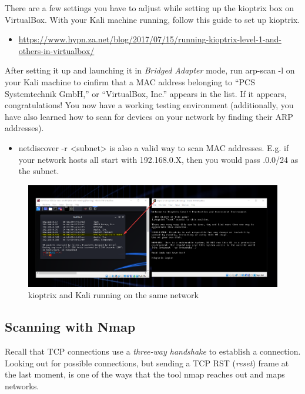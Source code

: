\documentclass[a4paper,11pt]{article}
\renewcommand{\tt}[2][tt]{\textcolor{#1}{\ttfamily #2}}%
\begin{document}
There are a few settings you have to adjust while setting up the kioptrix box on VirtualBox. With your Kali machine running, follow this guide to set up kioptrix.
\begin{itemize}
    \item \url{https://www.hypn.za.net/blog/2017/07/15/running-kioptrix-level-1-and-others-in-virtualbox/}
\end{itemize}
After setting it up and launching it in \textit{Bridged Adapter} mode, run \tt{arp-scan -l} on your Kali machine to cinfirm that a MAC address belonging to ``PCS Systemtechnik GmbH,'' or ``VirtualBox, Inc.'' appears in the list. If it appears, congratulations! You now have a working testing environment (additionally, you have also learned how to scan for devices on your network by finding their ARP addresses).
\begin{itemize}
    \item \tt{netdiscover -r <subnet>} is also a valid way to scan MAC addresses. E.g. if your network hosts all start with 192.168.0.X, then you would pass \tt{192.168.0.0/24} as the \tt{subnet}.
\end{itemize}

\begin{figure}[h]
    \centering
    \includegraphics[width=1\textwidth]{images/kioptrix1.png}
    \caption{\small{kioptrix and Kali running on the same network}}
    \label{fig:kioptrix1}
\end{figure}

\subsection{Scanning with Nmap}

Recall that TCP connections use a \textit{three-way handshake} to establish a connection. Looking out for possible connections, but sending a TCP RST (\textit{reset}) frame at the last moment, is one of the ways that the tool \tt{nmap} reaches out and maps networks.
\end{document}
